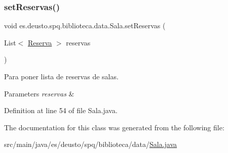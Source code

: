 \subsubsection{\texorpdfstring{set\+Reservas()}{setReservas()}}
{\footnotesize\ttfamily void es.\+deusto.\+spq.\+biblioteca.\+data.\+Sala.\+set\+Reservas (\begin{DoxyParamCaption}\item[{List$<$ \mbox{\hyperlink{classes_1_1deusto_1_1spq_1_1biblioteca_1_1data_1_1_reserva}{Reserva}} $>$}]{reservas }\end{DoxyParamCaption})}

Para poner lista de reservas de salas. 
\begin{DoxyParams}{Parameters}
{\em reservas} & \\
\hline
\end{DoxyParams}


Definition at line 54 of file Sala.\+java.



The documentation for this class was generated from the following file\+:\begin{DoxyCompactItemize}
\item 
src/main/java/es/deusto/spq/biblioteca/data/\mbox{\hyperlink{_sala_8java}{Sala.\+java}}\end{DoxyCompactItemize}
